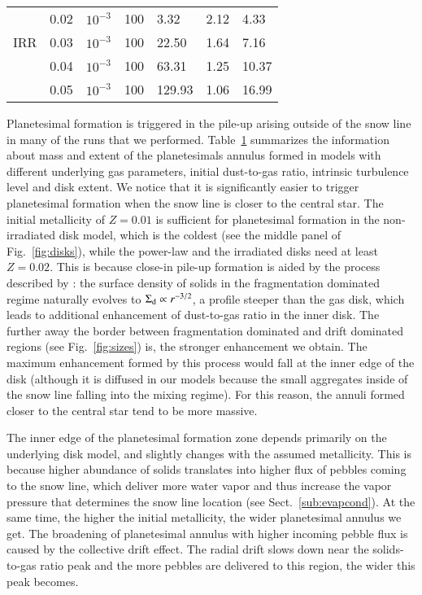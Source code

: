 \documentclass{aa}
\begin{document}
\begin{table}
\begin{tabular}{c l l l l l l}
            & 0.02 & $10^{-3}$ & 100 & 3.32 & 2.12 & 4.33 \\
IRR  & 0.03 & $10^{-3}$ & 100 & 22.50 & 1.64 & 7.16 \\
            & 0.04 & $10^{-3}$ & 100 & 63.31 & 1.25 & 10.37  \\
            & 0.05 & $10^{-3}$ & 100 & 129.93 & 1.06 & 16.99 \\
\hline\hline
\end{tabular}
\label{table:allruns} 
\end{table}

Planetesimal formation is triggered in the pile-up arising outside of the snow line in many of the runs that we performed. Table~\ref{table:allruns} summarizes the information about mass and extent of the planetesimals annulus formed in models with different underlying gas parameters, initial dust-to-gas ratio, intrinsic turbulence level and disk extent. We notice that it is significantly easier to trigger planetesimal formation when the snow line is closer to the central star. The initial metallicity of $Z=0.01$ is sufficient for planetesimal formation in the non-irradiated disk model, which is the coldest (see the middle panel of Fig.~\ref{fig:disks}), while the power-law and the irradiated disks need at least $Z=0.02$. This is because close-in pile-up formation is aided by the process described by \citet{2016A&A...594A.105D}: the surface density of solids in the fragmentation dominated regime naturally evolves to $\Sigma_{\rm d}\propto r^{-3/2}$, a profile steeper than the gas disk, which leads to additional enhancement of dust-to-gas ratio in the inner disk. The further away the border between fragmentation dominated and drift dominated regions (see Fig.~\ref{fig:sizes}) is, the stronger enhancement we obtain. The maximum enhancement formed by this process would fall at the inner edge of the disk (although it is diffused in our models because the small aggregates inside of the snow line falling into the mixing regime). 
For this reason, the annuli formed closer to the central star tend to be more massive. 

The inner edge of the planetesimal formation zone depends primarily on the underlying disk model, and slightly changes with the assumed metallicity. This is because higher abundance of solids translates into higher flux of pebbles coming to the snow line, which deliver more water vapor and thus increase the vapor pressure that determines the snow line location (see Sect.~\ref{sub:evapcond}). At the same time, the higher the initial metallicity, the wider planetesimal annulus we get. The broadening of planetesimal annulus with higher incoming pebble flux is caused by the collective drift effect. The radial drift slows down near the solids-to-gas ratio peak and the more pebbles are delivered to this region, the wider this peak becomes. 
\end{document}
